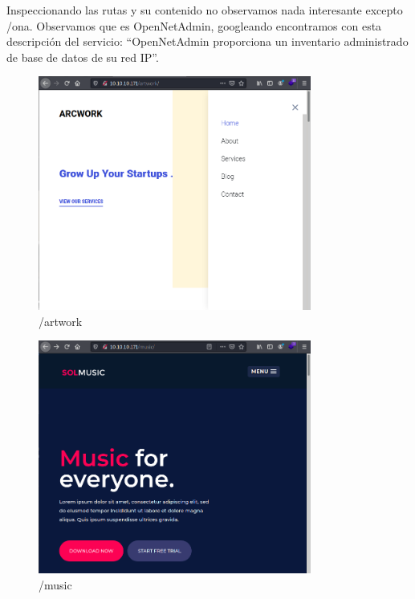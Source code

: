 \documentclass{article}
\begin{document}
Inspeccionando las rutas y su contenido no observamos nada interesante excepto /ona. Observamos que es OpenNetAdmin, googleando encontramos con esta descripción del servicio: “OpenNetAdmin proporciona un inventario administrado de base de datos de su red IP”.
\begin{figure}[h]
	\center
	\includegraphics[width=0.8\textwidth]{images/openadmin/3-artwork.png}
	\caption{/artwork}
\end{figure}

\begin{figure}[h]
	\center
	\includegraphics[width=0.8\textwidth]{images/openadmin/4-music.png}
	\caption{/music}
\end{figure}
\end{document}
